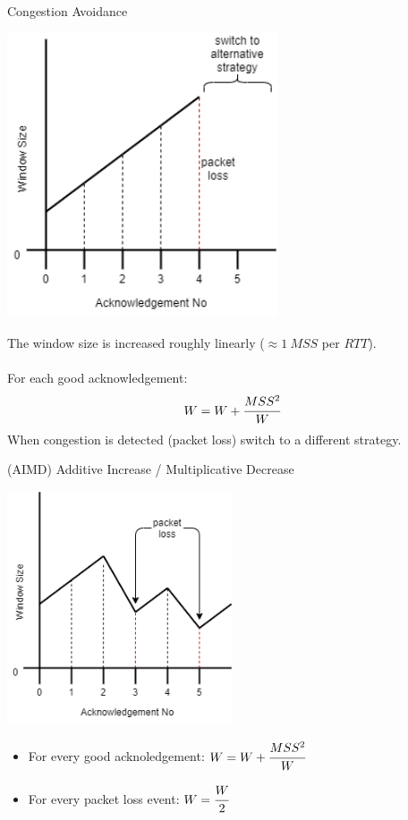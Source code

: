 \begin{definitionbox}{Congestion Avoidance}
    \begin{center}\includegraphics[width=0.6\textwidth]{transport_layer/images/congestion avoidance.png}\end{center}
    The window size is increased roughly linearly ($\approx 1 \ MSS$ per $RTT$).
    \\
    \\ For each good acknowledgement:
    \[W = W + \cfrac{MSS^2}{W}\]
    When congestion is detected (packet loss) switch to a different strategy.
\end{definitionbox}
\begin{definitionbox}{(AIMD) Additive Increase / Multiplicative Decrease}
    \begin{center}\includegraphics[width=0.5\textwidth]{transport_layer/images/AIMD.png}\end{center}
    \begin{itemize}
        \setlength\itemsep{0em}
        \item For every good acknoledgement: $W = W + \cfrac{MSS^2}{W}$
        \item For every packet loss event: $W = \cfrac{W}{2}$
    \end{itemize}
\end{definitionbox}
